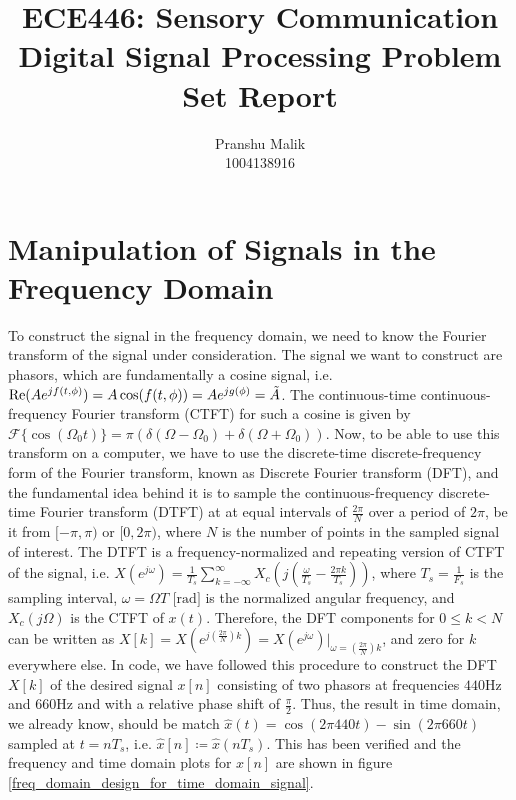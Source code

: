 \documentclass[10pt]{article}
\date{}
\begin{document}
\title{\textbf{\Large{\textsc{ECE446:} Sensory Communication}} \\ \Large{Digital Signal Processing Problem Set Report}\vspace{-0.3cm}}
\author{Pranshu Malik\\ \footnotesize{1004138916}\vspace{-3cm}}

\maketitle

\section{Manipulation of Signals in the Frequency Domain}
To construct the signal in the frequency domain, we need to know the Fourier transform of the signal under consideration. The signal we want to construct are phasors, which are fundamentally a cosine signal, i.e. $\text{Re}(Ae^{jf(t,\phi)}) = A\cos(f(t,\phi)) = Ae^{jg(\phi)} = \Tilde{A}$. The continuous-time continuous-frequency Fourier transform (CTFT) for such a cosine is given by $\mathcal{F}\{\cos(\Omega_0t)\} = \pi(\delta(\Omega - \Omega_0) + \delta(\Omega + \Omega_0))$. Now, to be able to use this transform on a computer, we have to use the discrete-time discrete-frequency form of the Fourier transform, known as Discrete Fourier transform (DFT), and the fundamental idea behind it is to sample the continuous-frequency discrete-time Fourier transform (DTFT) at at equal intervals of $\frac{2\pi}{N}$ over a period of $2\pi$, be it from $[-\pi, \pi)$ or $[0, 2\pi)$, where $N$ is the number of points in the sampled signal of interest. The DTFT is a frequency-normalized and repeating version of CTFT of the signal, i.e. $X(e^{j\omega}) = \frac{1}{T_s}\sum_{k=-\infty}^{\infty}X_c(j(\frac{\omega}{T_s} - \frac{2\pi k}{T_s}))$, where $T_s = \frac{1}{F_s}$ is the sampling interval, $\omega = \Omega T \text{ [rad]}$ is the normalized angular frequency, and $X_c(j\Omega)$ is the CTFT of $x(t)$. Therefore, the DFT components for $0\leq k < N$ can be written as $X[k] = X(e^{j(\frac{2\pi}{N})k}) = X(e^{j\omega})\rvert_{\omega = (\frac{2\pi}{N})k}$, and zero for $k$ everywhere else. In code, we have followed this procedure to construct the DFT $X[k]$ of the desired signal $x[n]$ consisting of two phasors at frequencies $440$Hz and $660$Hz and with a relative phase shift of $\frac{\pi}{2}$. Thus, the result in time domain, we already know, should be match $\hat{x}(t) = \cos(2\pi440t) - \sin(2\pi660t)$ sampled at $t = nT_s$, i.e. $\hat{x}[n] \coloneqq \hat{x}(nT_s)$. This has been verified and the frequency and time domain plots for $x[n]$ are shown in figure \ref{freq_domain_design_for_time_domain_signal}.
\end{document}
